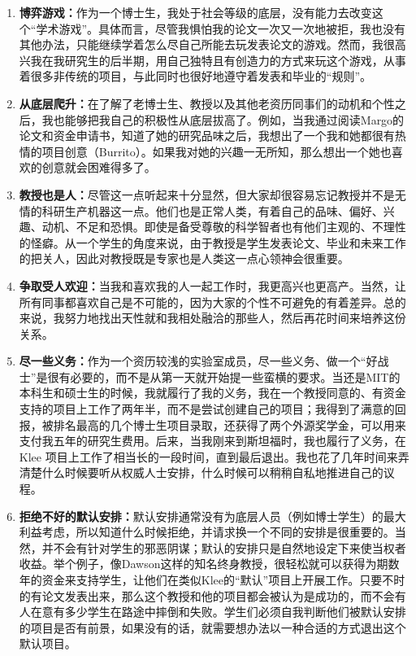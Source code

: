 \documentclass[letter,12pt]{book}
\begin{document}
\begin{CJK}{UTF8}{gbsn}
\begin{enumerate}
  \item \textbf{博弈游戏：}作为一个博士生，我处于社会等级的底层，没有能力去改变这个“学术游戏”。具体而言，尽管我惧怕我的论文一次又一次地被拒，我也没有其他办法，只能继续学着怎么尽自己所能去玩发表论文的游戏。然而，我很高兴我在我研究生的后半期，用自己独特且有创造力的方式来玩这个游戏，从事着很多非传统的项目，与此同时也很好地遵守着发表和毕业的“规则”。
  \item \textbf{从底层爬升：}在了解了老博士生、教授以及其他老资历同事们的动机和个性之后，我也能够把我自己的积极性从底层拔高了。例如，当我通过阅读Margo的论文和资金申请书，知道了她的研究品味之后，我想出了一个我和她都很有热情的项目创意（Burrito）。如果我对她的兴趣一无所知，那么想出一个她也喜欢的创意就会困难得多了。
  \item \textbf{教授也是人：}尽管这一点听起来十分显然，但大家却很容易忘记教授并不是无情的科研生产机器这一点。他们也是正常人类，有着自己的品味、偏好、兴趣、动机、不足和恐惧。即使是备受尊敬的科学智者也有他们主观的、不理性的怪癖。从一个学生的角度来说，由于教授是学生发表论文、毕业和未来工作的把关人，因此对教授既是专家也是人类这一点心领神会很重要。
  \item \textbf{争取受人欢迎：}当我和喜欢我的人一起工作时，我更高兴也更高产。当然，让所有同事都喜欢自己是不可能的，因为大家的个性不可避免的有着差异。总的来说，我努力地找出天性就和我相处融洽的那些人，然后再花时间来培养这份关系。
  \item \textbf{尽一些义务：}作为一个资历较浅的实验室成员，尽一些义务、做一个“好战士”是很有必要的，而不是从第一天就开始提一些蛮横的要求。当还是MIT的本科生和硕士生的时候，我就履行了我的义务，我在一个教授同意的、有资金支持的项目上工作了两年半，而不是尝试创建自己的项目；我得到了满意的回报，被排名最高的几个博士生项目录取，还获得了两个外源奖学金，可以用来支付我五年的研究生费用。后来，当我刚来到斯坦福时，我也履行了义务，在Klee 项目上工作了相当长的一段时间，直到最后退出。我也花了几年时间来弄清楚什么时候要听从权威人士安排，什么时候可以稍稍自私地推进自己的议程。
  \item \textbf{拒绝不好的默认安排：}默认安排通常没有为底层人员（例如博士学生）的最大利益考虑，所以知道什么时候拒绝，并请求换一个不同的安排是很重要的。当然，并不会有针对学生的邪恶阴谋；默认的安排只是自然地设定下来使当权者收益。举个例子，像Dawson这样的知名终身教授，很轻松就可以获得为期数年的资金来支持学生，让他们在类似Klee的“默认”项目上开展工作。只要不时的有论文发表出来，那么这个教授和他的项目都会被认为是成功的，而不会有人在意有多少学生在路途中摔倒和失败。学生们必须自我判断他们被默认安排的项目是否有前景，如果没有的话，就需要想办法以一种合适的方式退出这个默认项目。

\end{enumerate}
\end{CJK}
\end{document}
